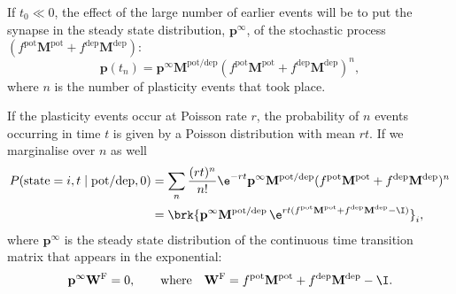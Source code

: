 \documentclass[12pt]{article}
\newcommand{\pr}{\mathbf{p}}
\newcommand{\eq}{\pr^\infty}
\newcommand{\W}{\mathbf{W}}
\newcommand{\M}{\mathbf{M}}
\newcommand{\frg}{\W^{\mathrm{F}}}
\newcommand{\pot}{^{\text{pot}}}
\newcommand{\dep}{^{\text{dep}}}
\newcommand{\potdep}{^{\text{pot/dep}}}
\begin{document}
If $t_0 \ll 0$, the effect of the large number of earlier events will be to put the synapse in the steady state distribution, $\eq$, of the stochastic process $(f\pot\M\pot+f\dep\M\dep)$:
%
\begin{equation}\label{eq:plastseqeq}
  \pr(t_n) = \eq \M\potdep (f\pot\M\pot+f\dep\M\dep)^n,
\end{equation}
%
where $n$ is the number of plasticity events that took place.

If the plasticity events occur at Poisson rate $r$, the probability of $n$ events occurring in time $t$ is given by a Poisson distribution with mean $rt$.
If we marginalise over $n$ as well
%
\begin{equation}\label{eq:plastseqav}
\begin{aligned}
  P(\text{state}=i,t \mid \text{pot/dep},0)
    &= \sum_n \frac{(rt)^n}{n!} \e^{-rt} \eq \M\potdep (f\pot\M\pot+f\dep\M\dep)^n \\
    &= \brk{ \eq \M\potdep\, \e^{rt(f\pot\M\pot+f\dep\M\dep-\I) } }_i,
\end{aligned}
\end{equation}
%
where $\eq$ is the steady state distribution of the continuous time transition matrix that appears in the exponential:
%
\begin{equation}\label{eq:eq}
  \eq\frg = 0,
  \qquad\text{where}\quad
  \frg = f\pot\M\pot + f\dep\M\dep - \I.
\end{equation}
%
\end{document}
